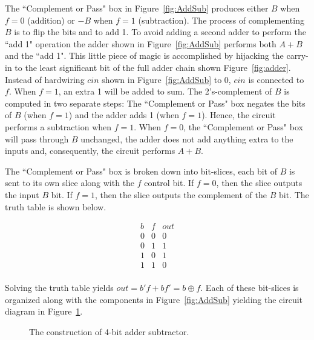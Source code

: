The ``Complement or Pass" box in Figure~\ref{fig:AddSub} produces 
either $B$ when $f=0$ (addition) or $-B$ when $f=1$ (subtraction).
The process of complementing $B$ is to flip the bits and to add 1.
To avoid adding a second adder to perform the ``add 1" 
operation the adder shown in Figure~\ref{fig:AddSub} performs 
both $A+B$ and the ``add 1".  This little piece of magic is 
accomplished by hijacking the carry-in to the least significant 
bit of the full adder chain shown Figure~\ref{fig:adder}.  Instead
of hardwiring $cin$ shown in Figure~\ref{fig:AddSub} to 0, $cin$ is 
connected to $f$.  
When $f=1$, an extra 1 will be added to sum. The 2's-complement of
$B$ is computed in two separate steps: The ``Complement or Pass" box 
negates the bits of $B$ (when $f=1$) and the adder adds 1
(when $f=1$). Hence, the circuit performs a subtraction when $f=1$.
When $f=0$, the ``Complement or Pass" box will pass through $B$
unchanged, the adder does not add anything extra to the inputs and,
consequently, the circuit performs $A+B$.

The ``Complement or Pass" box is broken down into bit-slices, each
bit of $B$ is sent to its own slice along with the $f$ control
bit.  If $f=0$, then the slice outputs the input $B$ bit.  If $f=1$, 
then the slice outputs the complement of the $B$ bit.
The truth table is shown below.

$$\begin{array}{c|c||c}
b & f & out \\ \hline
0 & 0 & 0 \\ \hline
0 & 1 & 1 \\ \hline
1 & 0 & 1 \\ \hline
1 & 1 & 0 \\
\end{array}$$

Solving the truth table yields $out = b'f + bf' = b \oplus f$.
Each of these bit-slices is organized along with the components
in Figure~\ref{fig:AddSub} yielding the circuit diagram in
Figure~\ref{fig:TotalAddSub}.


\begin{figure}[ht]
\caption{The construction of 4-bit adder subtractor.}
\label{fig:TotalAddSub}
\end{figure}
\label{page:as}


